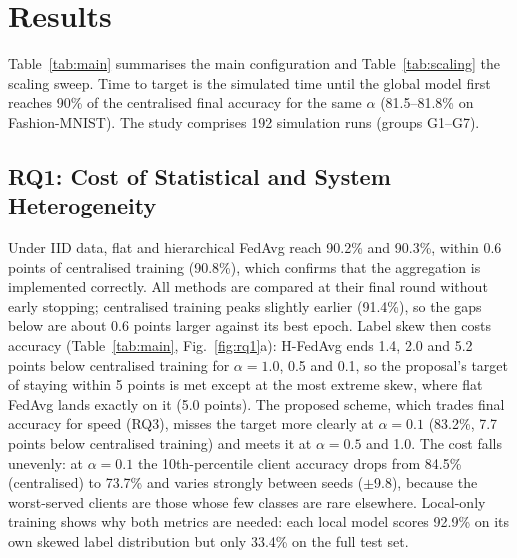 \documentclass[conference]{IEEEtran}
\begin{document}
\section{Results}
\label{sec:results}

Table~\ref{tab:main} summarises the main configuration and Table~\ref{tab:scaling} the scaling sweep. Time to target is the simulated time until the global model first reaches 90\% of the centralised final accuracy for the same $\alpha$ (81.5--81.8\% on Fashion-MNIST). The study comprises 192 simulation runs (groups G1--G7).

\begin{table}[t]
\centering
\caption{Main configuration ($E = 4$, $K = 5$, mixed tiers): final accuracy, 10th-percentile client accuracy, time and edge rounds to target ($R_{\mathrm{tgt}}$; hierarchical methods are evaluated every second round) and server traffic (mean $\pm$ std over three seeds)}
\label{tab:main}
\footnotesize

\end{table}

\subsection{RQ1: Cost of Statistical and System Heterogeneity}
Under IID data, flat and hierarchical FedAvg reach 90.2\% and 90.3\%, within 0.6 points of centralised training (90.8\%), which confirms that the aggregation is implemented correctly. All methods are compared at their final round without early stopping; centralised training peaks slightly earlier (91.4\%), so the gaps below are about 0.6 points larger against its best epoch. Label skew then costs accuracy (Table~\ref{tab:main}, Fig.~\ref{fig:rq1}a): H-FedAvg ends 1.4, 2.0 and 5.2 points below centralised training for $\alpha = 1.0$, 0.5 and 0.1, so the proposal's target of staying within 5 points is met except at the most extreme skew, where flat FedAvg lands exactly on it (5.0 points). The proposed scheme, which trades final accuracy for speed (RQ3), misses the target more clearly at $\alpha = 0.1$ (83.2\%, 7.7 points below centralised training) and meets it at $\alpha = 0.5$ and 1.0. The cost falls unevenly: at $\alpha = 0.1$ the 10th-percentile client accuracy drops from 84.5\% (centralised) to 73.7\% and varies strongly between seeds ($\pm$9.8), because the worst-served clients are those whose few classes are rare elsewhere. Local-only training shows why both metrics are needed: each local model scores 92.9\% on its own skewed label distribution but only 33.4\% on the full test set.
\end{document}
